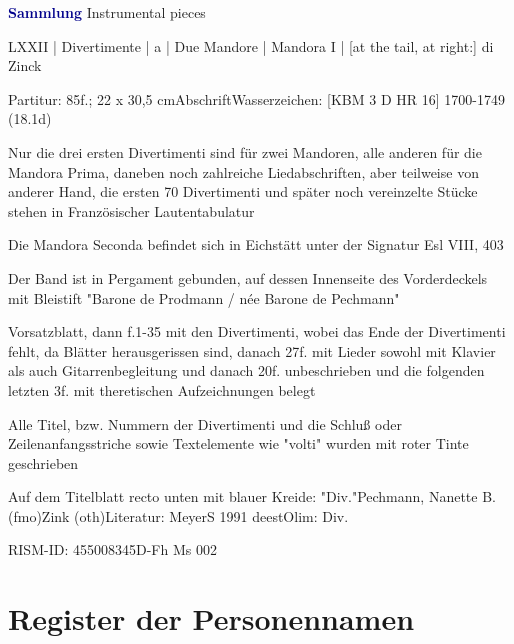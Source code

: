 \documentclass[twocolumn]{book}
\begin{document}
\par \vspace{7pt} \textcolor{darkblue}{\textbf{Sammlung}} Instrumental pieces
\par \begin{itshape} LXXII | Divertimente | a | Due Mandore | Mandora I | [at the tail, at right:] di Zinck\end{itshape} 
\par \textcolor{darkblue}{}  Partitur: 85f.; 22 x 30,5 cm\newline Abschrift\newline Wasserzeichen: [KBM 3 D HR 16]  1700-1749 (18.1d)
\par Nur die drei ersten Divertimenti sind für zwei Mandoren, alle anderen für die Mandora Prima, daneben noch zahlreiche Liedabschriften, aber teilweise von anderer Hand, die ersten 70 Divertimenti und später noch vereinzelte Stücke stehen in Französischer Lautentabulatur
\par Die Mandora Seconda befindet sich in Eichstätt unter der Signatur Esl VIII, 403
\par Der Band ist in Pergament gebunden, auf dessen Innenseite des Vorderdeckels mit Bleistift "Barone de Prodmann / née Barone de Pechmann"
\par Vorsatzblatt, dann f.1-35 mit den Divertimenti, wobei das Ende der Divertimenti fehlt, da Blätter herausgerissen sind, danach 27f. mit Lieder sowohl mit Klavier als auch Gitarrenbegleitung und danach 20f. unbeschrieben und die folgenden letzten 3f. mit theretischen Aufzeichnungen belegt
\par Alle Titel, bzw. Nummern der Divertimenti und die Schluß oder Zeilenanfangsstriche sowie Textelemente wie "volti" wurden mit roter Tinte geschrieben
\par Auf dem Titelblatt recto unten mit blauer Kreide: "Div."\newline Pechmann, Nanette B.  (fmo)\newline Zink  (oth)\newline Literatur: MeyerS 1991  deest\newline Olim: Div.
\par RISM-ID: 455008345\newline D-Fh  Ms 002
    \clearpage  
\chapter*{\centering Register der Personennamen}
\fancyhead{}
\end{document}
